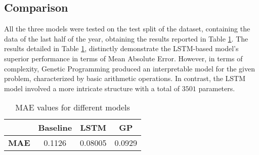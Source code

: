 \subsection{Comparison}

All the three models were tested on the test split of the dataset, containing the data of the last half of the year, obtaining the results reported in Table \ref{results}. The results detailed in Table \ref{results}, distinctly demonstrate the LSTM-based model's superior performance in terms of Mean Absolute Error. However, in terms of complexity, Genetic Programming produced an interpretable model for the given problem, characterized by basic arithmetic operations. In contrast, the LSTM model involved a more intricate structure with a total of $3501$ parameters.

\begin{table}[htbp]
  \centering
  \begin{tabular}{lccc}
    \toprule
     & \textbf{Baseline} & \textbf{LSTM} & \textbf{GP} \\
    \midrule
    \textbf{MAE} & 0.1126 & 0.08005 & 0.0929 \\
    \bottomrule
  \end{tabular}
  \caption{MAE values for different models}
  \label{results}
\end{table}